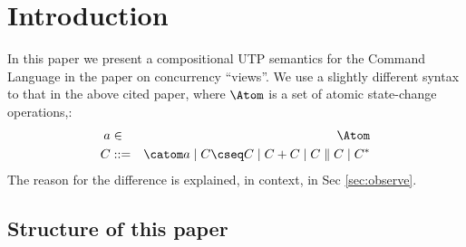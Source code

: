 \section{Introduction}\label{sec:Intro}

In this paper we present a compositional UTP semantics
for the Command Language in the paper
on concurrency ``views''\cite{conf/popl/Dinsdale-YoungBGPY13}.
We use a slightly different syntax to that in the above cited paper,
where $\Atom$ is a set of atomic state-change operations,:
\begin{eqnarray*}
   a &\in& \Atom
\\ C &::=& \catom a \mid C \cseq C \mid C+C \mid C \parallel C \mid C^*
\end{eqnarray*}
The reason for the difference is explained, in context, in Sec \ref{sec:observe}.






\subsection{Structure of this paper}
